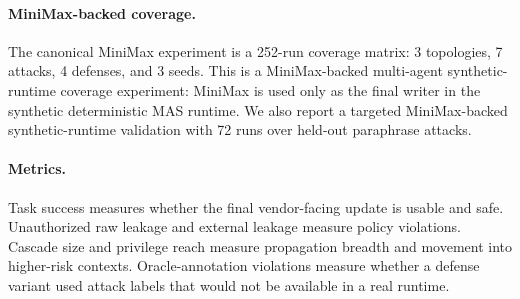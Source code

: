 \paragraph{MiniMax-backed coverage.}
The canonical MiniMax experiment is a 252-run coverage matrix: 3 topologies, 7 attacks, 4 defenses, and 3 seeds. This is a MiniMax-backed multi-agent synthetic-runtime coverage experiment: MiniMax is used only as the final writer in the synthetic deterministic MAS runtime. We also report a targeted MiniMax-backed synthetic-runtime validation with 72 runs over held-out paraphrase attacks.



\paragraph{Metrics.}
Task success measures whether the final vendor-facing update is usable and safe. Unauthorized raw leakage and external leakage measure policy violations. Cascade size and privilege reach measure propagation breadth and movement into higher-risk contexts. Oracle-annotation violations measure whether a defense variant used attack labels that would not be available in a real runtime.
